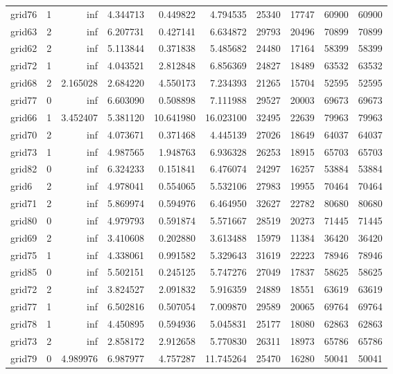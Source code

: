 \begin{longtable}{|l|r|r|r|r|r|r|r|r|r|}
grid76 & 1 & inf & 4.344713 & 0.449822 & 4.794535 & 25340 & 17747 & 60900 & 60900 \\
grid63 & 2 & inf & 6.207731 & 0.427141 & 6.634872 & 29793 & 20496 & 70899 & 70899 \\
grid62 & 2 & inf & 5.113844 & 0.371838 & 5.485682 & 24480 & 17164 & 58399 & 58399 \\
grid72 & 1 & inf & 4.043521 & 2.812848 & 6.856369 & 24827 & 18489 & 63532 & 63532 \\
grid68 & 2 & 2.165028 & 2.684220 & 4.550173 & 7.234393 & 21265 & 15704 & 52595 & 52595 \\
grid77 & 0 & inf & 6.603090 & 0.508898 & 7.111988 & 29527 & 20003 & 69673 & 69673 \\
grid66 & 1 & 3.452407 & 5.381120 & 10.641980 & 16.023100 & 32495 & 22639 & 79963 & 79963 \\
grid70 & 2 & inf & 4.073671 & 0.371468 & 4.445139 & 27026 & 18649 & 64037 & 64037 \\
grid73 & 1 & inf & 4.987565 & 1.948763 & 6.936328 & 26253 & 18915 & 65703 & 65703 \\
grid82 & 0 & inf & 6.324233 & 0.151841 & 6.476074 & 24297 & 16257 & 53884 & 53884 \\
grid6 & 2 & inf & 4.978041 & 0.554065 & 5.532106 & 27983 & 19955 & 70464 & 70464 \\
grid71 & 2 & inf & 5.869974 & 0.594976 & 6.464950 & 32627 & 22782 & 80680 & 80680 \\
grid80 & 0 & inf & 4.979793 & 0.591874 & 5.571667 & 28519 & 20273 & 71445 & 71445 \\
grid69 & 2 & inf & 3.410608 & 0.202880 & 3.613488 & 15979 & 11384 & 36420 & 36420 \\
grid75 & 1 & inf & 4.338061 & 0.991582 & 5.329643 & 31619 & 22223 & 78946 & 78946 \\
grid85 & 0 & inf & 5.502151 & 0.245125 & 5.747276 & 27049 & 17837 & 58625 & 58625 \\
grid72 & 2 & inf & 3.824527 & 2.091832 & 5.916359 & 24889 & 18551 & 63619 & 63619 \\
grid77 & 1 & inf & 6.502816 & 0.507054 & 7.009870 & 29589 & 20065 & 69764 & 69764 \\
grid78 & 1 & inf & 4.450895 & 0.594936 & 5.045831 & 25177 & 18080 & 62863 & 62863 \\
grid73 & 2 & inf & 2.858172 & 2.912658 & 5.770830 & 26311 & 18973 & 65786 & 65786 \\
grid79 & 0 & 4.989976 & 6.987977 & 4.757287 & 11.745264 & 25470 & 16280 & 50041 & 50041 \\

\end{longtable}
